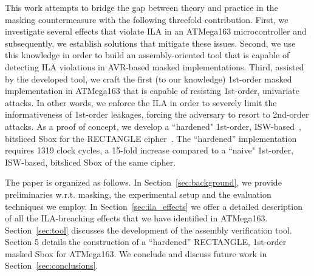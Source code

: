 This work attempts to bridge the gap between theory and practice in the masking countermeasure with the following threefold contribution. First, we investigate several effects that violate ILA in an ATMega163 microcontroller and subsequently, we establish solutions that mitigate these issues. Second, we use this knowledge in order to build an assembly-oriented tool that is capable of detecting ILA violations in AVR-based masked implementations. Third, assisted by the developed tool, we craft the first (to our knowledge) 1st-order masked implementation in ATMega163 that is capable of resisting 1st-order, univariate attacks. In other words, we enforce the ILA in order to severely limit the informativeness of 1st-order leakages, forcing the adversary to resort to 2nd-order attacks. As a proof of concept, we develop a ``hardened" 1st-order, ISW-based~\cite{DBLP:conf/crypto/IshaiSW03}, bitsliced Sbox for the RECTANGLE cipher~\cite{DBLP:journals/chinaf/ZhangBLR0V15}. The ``hardened'' implementation requires 1319 clock cycles, a 15-fold increase compared to a ``naive" 1st-order, ISW-based, bitsliced Sbox of the same cipher. 

The paper is organized as follows. In Section~\ref{sec:background}, we provide preliminaries w.r.t. masking, the experimental setup and the evaluation techniques we employ. In Section~\ref{sec:ila_effects} we offer a detailed description of all the ILA-breaching effects that we have identified in ATMega163. Section~\ref{sec:tool} discusses the development of the assembly verification tool. Section 5 details the construction of a ``hardened'' RECTANGLE, 1st-order masked Sbox for ATMega163. We conclude and discuss future work in Section~\ref{sec:conclusions}.


